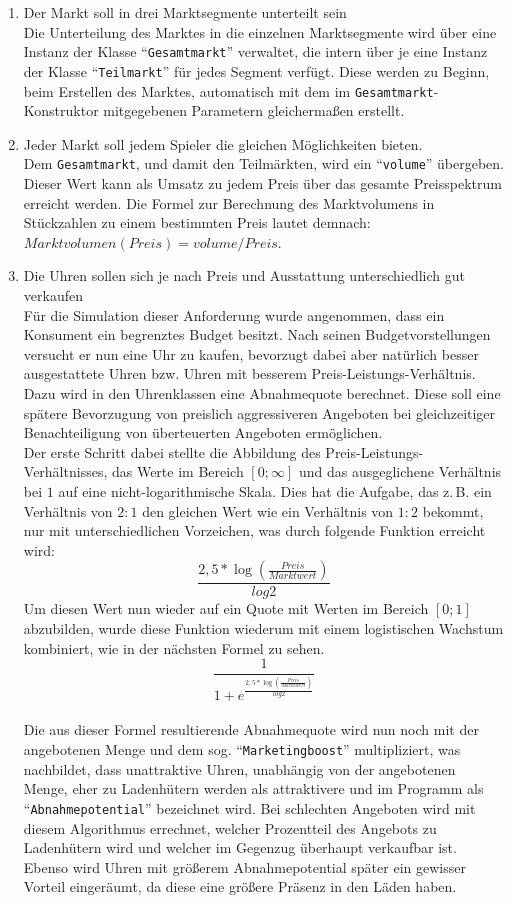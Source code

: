 \begin{enumerate}
\item Der Markt soll in drei Marktsegmente unterteilt sein
	\\ Die Unterteilung des Marktes in die einzelnen Marktsegmente wird über eine Instanz der Klasse \enquote{\texttt{Gesamtmarkt}} verwaltet, die intern über je eine Instanz der Klasse \enquote{\texttt{Teilmarkt}} für jedes Segment verfügt. Diese werden zu Beginn, beim Erstellen des Marktes, automatisch mit dem im \texttt{Gesamtmarkt}-Konstruktor mitgegebenen Parametern gleichermaßen erstellt.
\item Jeder Markt soll jedem Spieler die gleichen Möglichkeiten bieten.
	\\ Dem \texttt{Gesamtmarkt}, und damit den Teilmärkten, wird ein \enquote{\texttt{volume}} übergeben. Dieser Wert kann als Umsatz zu jedem Preis über das gesamte Preisspektrum erreicht werden. Die Formel zur Berechnung des Marktvolumens in Stückzahlen zu einem bestimmten Preis lautet demnach: \(Marktvolumen(Preis)=volume/Preis\).
\item Die Uhren sollen sich je nach Preis und Ausstattung unterschiedlich gut verkaufen
	\\ Für die Simulation dieser Anforderung wurde angenommen, dass ein Konsument ein begrenztes Budget besitzt. Nach seinen Budgetvorstellungen versucht er nun eine Uhr zu kaufen, bevorzugt dabei aber natürlich besser ausgestattete Uhren bzw. Uhren mit besserem Preis-Leistungs-Verhältnis. Dazu wird in den Uhrenklassen eine Abnahmequote berechnet. Diese soll eine spätere Bevorzugung von preislich aggressiveren Angeboten bei gleichzeitiger Benachteiligung von überteuerten Angeboten ermöglichen. \\
	Der erste Schritt dabei stellte die Abbildung des Preis-Leistungs-Verhältnisses, das Werte im Bereich \([0;\infty]\) und das ausgeglichene Verhältnis bei \(1\) auf eine nicht-logarithmische Skala. Dies hat die Aufgabe, das z.\,B. ein Verhältnis von \(2:1\) den gleichen Wert wie ein Verhältnis von \(1:2\) bekommt, nur mit unterschiedlichen Vorzeichen, was durch folgende Funktion erreicht wird: \[\frac{2,5*\log (\frac{Preis}{Marktwert})}{log 2}\]
	Um diesen Wert nun wieder auf ein Quote mit Werten im Bereich \([0;1]\) abzubilden, wurde diese Funktion wiederum mit einem logistischen Wachstum kombiniert, wie in der nächsten Formel zu sehen. \[\frac{1}{1+e^{\frac{2,5*\log (\frac{Preis}{Marktwert})}{log 2}}} \]\\
	Die aus dieser Formel resultierende Abnahmequote wird nun noch mit der angebotenen Menge und dem sog. \enquote{\texttt{Marketingboost}} multipliziert, was nachbildet, dass unattraktive Uhren, unabhängig von der angebotenen Menge, eher zu Ladenhütern werden als attraktivere und im Programm als \enquote{\texttt{Abnahmepotential}} bezeichnet wird. Bei schlechten Angeboten wird mit diesem Algorithmus errechnet, welcher Prozentteil des Angebots zu Ladenhütern wird und welcher im Gegenzug überhaupt verkaufbar ist. Ebenso wird Uhren mit größerem Abnahmepotential später ein gewisser Vorteil eingeräumt, da diese eine größere Präsenz in den Läden haben.

\end{enumerate}
